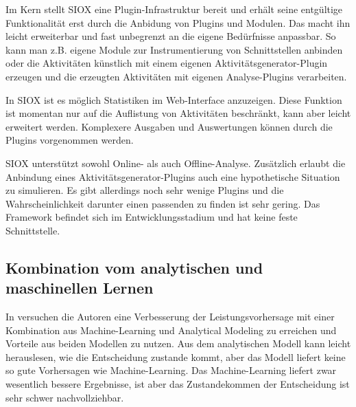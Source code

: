 Im Kern stellt SIOX eine Plugin-Infrastruktur bereit und erhält seine entgültige Funktionalität erst durch die Anbidung von Plugins und Modulen. 
Das macht ihn leicht erweiterbar und fast unbegrenzt an die eigene Bedürfnisse anpassbar. 
So kann man z.B. eigene Module zur Instrumentierung von Schnittstellen anbinden oder die Aktivitäten künstlich mit einem eigenen Aktivitätsgenerator-Plugin erzeugen und die erzeugten Aktivitäten mit eigenen Analyse-Plugins verarbeiten.

In SIOX ist es möglich Statistiken im Web-Interface anzuzeigen. 
Diese Funktion ist momentan nur auf die Auflistung von Aktivitäten beschränkt, kann aber leicht erweitert werden. 
Komplexere Ausgaben und Auswertungen können durch die Plugins vorgenommen werden.

SIOX unterstützt sowohl Online- als auch Offline-Analyse. 
Zusätzlich erlaubt die Anbindung eines Aktivitätsgenerator-Plugins auch eine hypothetische Situation zu simulieren. 
Es gibt allerdings noch sehr wenige Plugins und die Wahrscheinlichkeit darunter einen passenden zu finden ist sehr gering. 
Das Framework befindet sich im Entwicklungsstadium und hat keine feste Schnittstelle.


\subsection{Kombination vom analytischen und maschinellen Lernen}
In \cite{Didona:2015:EPP:2668930.2688047} versuchen die Autoren eine Verbesserung der Leistungsvorhersage mit einer Kombination aus Machine-Learning und Analytical Modeling zu erreichen und Vorteile aus beiden Modellen zu nutzen. 
Aus dem analytischen Modell kann leicht herauslesen, wie die Entscheidung zustande kommt, aber das Modell liefert keine so gute Vorhersagen wie Machine-Learning. 
Das Machine-Learning liefert zwar wesentlich bessere Ergebnisse, ist aber das Zustandekommen der Entscheidung ist sehr schwer nachvollziehbar. 

\bigskip

\textit{}